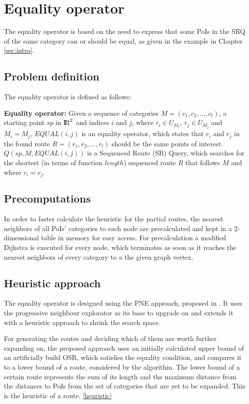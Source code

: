 \section{Equality operator}
The equality operator is based on the need to express that some PoIs in the SRQ of the same category can or should be equal, as given in the example in Chapter \ref{sec:intro}.

\subsection{Problem definition} 
\label{sec:problem}
The equality operator is defined as follows: \newline

\textbf{Equality operator:} Given a sequence of categories $M = (c_1, c_2, ..., c_l)$, a starting point $sp$ in ${\rm I\!R}^2$ and indices $i$ and $j$, where $r_i \in U_{M_{i}}$, $r_j \in U_{M_{j}}$ and $M_i = M_j$, $EQUAL(i, j)$ is an equality operator, which states that $r_i$ and $r_j$ in the found route $R = (r_1, r_2, ..., r_l)$ should be the same points of interest.
$Q(sp, M, EQUAL(i, j))$ is a Sequenced Route (SR) Query, which searches for the shortest (in terms of function $length$) sequenced route $R$ that follows $M$ and where $r_i = r_j$.

\subsection{Precomputations} 
\label{sec:precomp}
In order to faster calculate the heuristic for the partial routes, the nearest neighbors of all PoIs' categories to each node are precalculated and kept in a 2-dimensional table in memory for easy access. For precalculation a modified Dijkstra is executed for every node, which terminates as soon as it reaches the nearest neighbors of every category to a the given graph vertex.

\subsection{Heuristic approach} 
\label{sec:heuristic-approach}
The equality operator is designed using the PNE approach, proposed in \cite{OSR}. It uses the progressive neighbour explorator as its base to upgrade on and extends it with a heuristic approach to shrink the search space. \newline

For generating the routes and deciding which of them are worth further expanding on, the proposed approach uses an initially calculated upper bound of an artificially build OSR, which satisfies the equality condition, and compares it to a lower bound of a route, considered by the algorithm. The lower bound of a certain route represents the sum of its length and the maximum distance from the distances to PoIs from the set of categories that are yet to be expanded. This is the heuristic of a route. \ref{heuristic}

